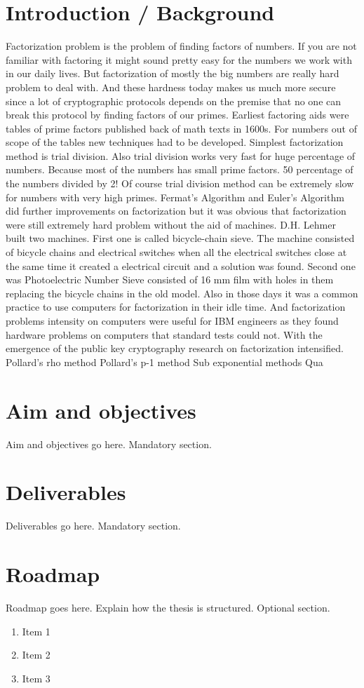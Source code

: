 \section{Introduction / Background}
Factorization problem is the  problem of finding factors of numbers. If you
are not familiar with factoring it might sound pretty easy for the
numbers we work with in our daily lives. But factorization of mostly the
big numbers are really hard problem to deal with. And these hardness today makes
us much more secure since a lot of cryptographic protocols depends on the
premise that no one can break this protocol by finding factors of our primes.
Earliest factoring aids were tables of prime factors
published back of math texts in 1600s. For numbers out of scope of the tables
new techniques had to be developed.
Simplest factorization method is trial division. Also trial division works very
fast for huge percentage of numbers. Because most of the numbers has small prime
factors. 50 percentage of the numbers divided by 2! Of course trial division
method can be extremely slow for numbers with very high primes.
Fermat's Algorithm and Euler's Algorithm did further improvements on
factorization but it was obvious that factorization were still extremely hard
problem without the aid of machines. 
D.H. Lehmer built two machines. First one is called bicycle-chain sieve. The
machine consisted of bicycle chains and electrical switches when all the
electrical switches close at the same time it created a electrical circuit and a
solution was found. Second one was Photoelectric Number Sieve consisted of 16 mm
film with holes in them replacing the bicycle chains in the old model. Also in
those days it was a common practice to use computers for factorization in their
idle time. And factorization problems intensity on computers were useful for IBM
engineers as they found hardware problems on computers that standard tests could
not.
With the emergence of the public key cryptography research on factorization
intensified.
Pollard's rho method
Pollard's p-1 method
Sub exponential methods
Qua

\section{Aim and objectives}
Aim and objectives go here.
Mandatory section.

\section{Deliverables}
Deliverables go here.
Mandatory section.

\section{Roadmap}
Roadmap goes here. Explain how the thesis is structured.
Optional section.


















\begin{enumerate}   
	\item Item 1
	\item Item 2
	\item Item 3
\end{enumerate}